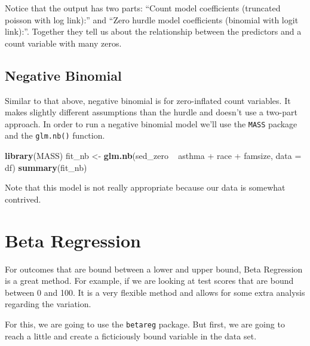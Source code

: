 \documentclass[]{tufte-book}
\newenvironment{Shaded}{}{}
\newcommand{\KeywordTok}[1]{\textcolor[rgb]{0.00,0.44,0.13}{\textbf{#1}}}
\newcommand{\DataTypeTok}[1]{\textcolor[rgb]{0.56,0.13,0.00}{#1}}
\newcommand{\StringTok}[1]{\textcolor[rgb]{0.25,0.44,0.63}{#1}}
\newcommand{\OperatorTok}[1]{\textcolor[rgb]{0.40,0.40,0.40}{#1}}
\newcommand{\NormalTok}[1]{#1}
\theoremstyle{definition}
\theoremstyle{definition}
\theoremstyle{remark}
\begin{document}
Notice that the output has two parts: ``Count model coefficients
(truncated poisson with log link):'' and ``Zero hurdle model
coefficients (binomial with logit link):''. Together they tell us about
the relationship between the predictors and a count variable with many
zeros.

\subsection*{Negative Binomial}\label{negative-binomial}

Similar to that above, negative binomial is for zero-inflated count
variables. It makes slightly different assumptions than the hurdle and
doesn't use a two-part approach. In order to run a negative binomial
model we'll use the \texttt{MASS} package and the \texttt{glm.nb()}
function.

\begin{Shaded}
\begin{Highlighting}[]
\KeywordTok{library}\NormalTok{(MASS)}
\NormalTok{fit_nb <-}\StringTok{ }\KeywordTok{glm.nb}\NormalTok{(sed_zero }\OperatorTok{~}\StringTok{ }\NormalTok{asthma }\OperatorTok{+}\StringTok{ }\NormalTok{race }\OperatorTok{+}\StringTok{ }\NormalTok{famsize, }
    \DataTypeTok{data =}\NormalTok{ df)}
\KeywordTok{summary}\NormalTok{(fit_nb)}
\end{Highlighting}
\end{Shaded}

Note that this model is not really appropriate because our data is
somewhat contrived.

\section*{Beta Regression}\label{beta-regression}

For outcomes that are bound between a lower and upper bound, Beta
Regression is a great method. For example, if we are looking at test
scores that are bound between 0 and 100. It is a very flexible method
and allows for some extra analysis regarding the variation.

For this, we are going to use the \texttt{betareg} package. But first,
we are going to reach a little and create a ficticiously bound variable
in the data set.
\end{document}
